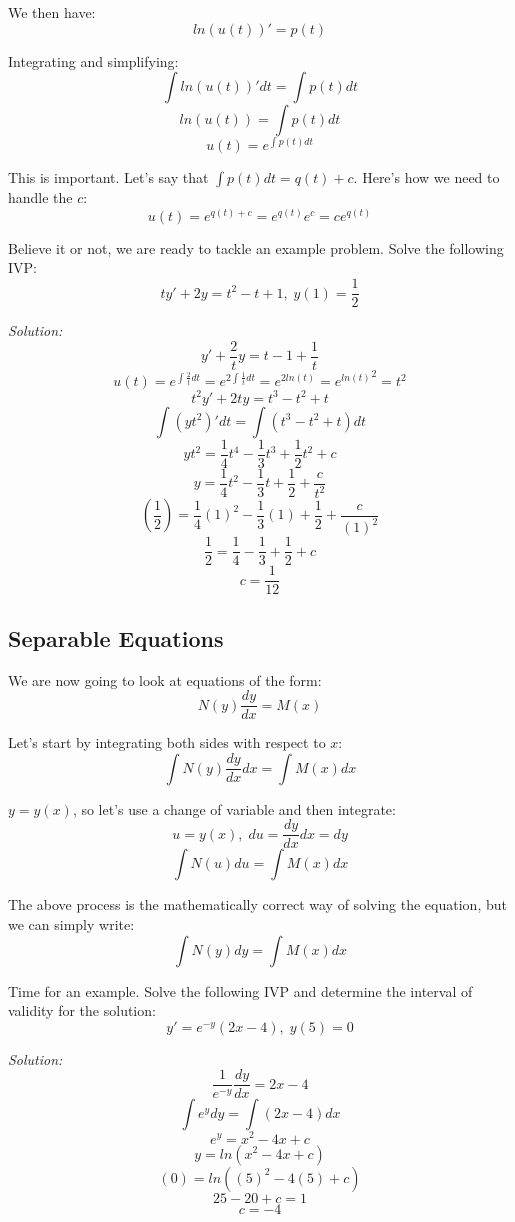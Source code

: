 We then have: $$ln(u(t))' = p(t)$$

Integrating and simplifying:
$$\int ln(u(t))'dt = \int p(t)dt$$
$$ln(u(t)) = \int p(t)dt$$
$$u(t) = e^{\int p(t)dt}$$

This is important. Let's say that $\int p(t)dt = q(t) + c$. Here's how we need to handle the $c$:
$$u(t) = e^{q(t) + c} = e^{q(t)}e^{c} = ce^{q(t)}$$

Believe it or not, we are ready to tackle an example problem. Solve the following IVP:
$$ty' + 2y = t^2 - t + 1,\;y(1) = \frac{1}{2}$$

\textit{Solution:}
$$y' + \frac{2}{t}y = t - 1 + \frac{1}{t}$$
$$u(t) = e^{\int \frac{2}{t}dt} = e^{2\int \frac{1}{t}dt} = e^{2ln(t)} = {e^{ln(t)}}^2 = t^{2}$$
$$t^{2}y' + 2ty = t^{3} - t^{2} + t$$
$$\int (yt^{2})'dt = \int (t^{3} - t^{2} + t)dt$$
$$yt^{2} = \frac{1}{4}t^{4} - \frac{1}{3}t^{3} + \frac{1}{2}t^{2} + c$$
$$y = \frac{1}{4}t^{2} - \frac{1}{3}t + \frac{1}{2} + \frac{c}{t^{2}}$$
$$\left(\frac{1}{2}\right) = \frac{1}{4}(1)^{2} - \frac{1}{3}(1) + \frac{1}{2} + \frac{c}{(1)^{2}}$$
$$\frac{1}{2} = \frac{1}{4} - \frac{1}{3} + \frac{1}{2} + c$$
$$c = \frac{1}{12}$$
\begin{center}
\end{center}

\pagebreak

\subsection{Separable Equations}
We are now going to look at equations of the form:
$$N(y)\frac{dy}{dx} = M(x)$$

Let's start by integrating both sides with respect to $x$:
$$\int N(y)\frac{dy}{dx}dx = \int M(x)dx$$

$y = y(x)$, so let's use a change of variable and then integrate:
$$u = y(x),\;du = \frac{dy}{dx}dx = dy$$
$$\int N(u)du = \int M(x)dx$$

The above process is the mathematically correct way of solving the equation, but we can simply write:
$$\int N(y)dy = \int M(x)dx$$

Time for an example. Solve the following IVP and determine the interval of validity for the solution:
$$y' = e^{-y}(2x - 4),\;y(5) = 0$$

\textit{Solution:}
$$\frac{1}{e^{-y}}\frac{dy}{dx} = 2x - 4$$
$$\int e^{y}dy = \int (2x - 4)dx$$
$$e^{y} = x^{2} - 4x + c$$
$$y = ln(x^{2} - 4x + c)$$
$$(0) = ln((5)^{2} - 4(5) + c)$$
$$25 - 20 + c = 1$$
$$c = -4$$
\begin{center}
\end{center}

